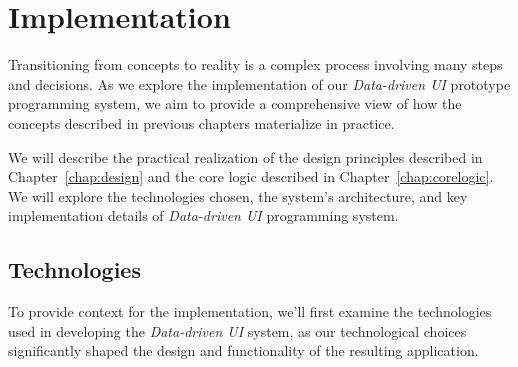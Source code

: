\chapter{Implementation}
\label{chap:implementation}

Transitioning from concepts to reality is a complex process involving many steps and decisions.
As we explore the implementation of our \emph{Data-driven UI} prototype programming system, we aim to provide a comprehensive view of how the concepts described in previous chapters materialize in practice.

We will describe the practical realization of the design principles described in Chapter~\ref{chap:design} and the core logic described in Chapter~\ref{chap:corelogic}.
We will explore the technologies chosen, the system's architecture, and key implementation details of \emph{Data-driven UI} programming system.



\section{Technologies}
\label{sec:technologies}
To provide context for the implementation, we'll first examine the technologies used in developing the \emph{Data-driven UI} system, as our technological choices significantly shaped the design and functionality of the resulting application.

